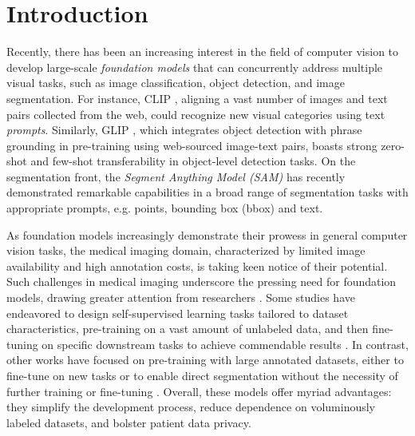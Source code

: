 \documentclass[times,twocolumn,final]{elsarticle}
\begin{document}

\section{Introduction}
\label{sec1}


\par Recently, there has been an increasing interest in the field of computer vision to develop large-scale \textit{foundation models} that can concurrently address multiple visual tasks, such as image classification, object detection, and image segmentation. For instance, CLIP \citep{radford2021learning}, aligning a vast number of images and text pairs collected from the web, could recognize new visual categories using text \textit{prompts}. Similarly, GLIP \citep{li2022grounded, zhang2022glipv2}, which integrates object detection with phrase grounding in pre-training using web-sourced image-text pairs, boasts strong zero-shot and few-shot transferability in object-level detection tasks. On the segmentation front, the \textit{Segment Anything Model (SAM)} \citep{kirillov2023segment} has recently demonstrated remarkable capabilities in a broad range of segmentation tasks with appropriate prompts, e.g. points, bounding box (bbox) and text.

\par As foundation models increasingly demonstrate their prowess in general computer vision tasks, the medical imaging domain, characterized by limited image availability and high annotation costs, is taking keen notice of their potential. Such challenges in medical imaging underscore the pressing need for foundation models, drawing greater attention from researchers \citep{zhang2023challenges}. Some studies have endeavored to design self-supervised learning tasks tailored to dataset characteristics, pre-training on a vast amount of unlabeled data, and then fine-tuning on specific downstream tasks to achieve commendable results \citep{wang2023mis, zhou2023foundation, vorontsov2023virchow}. In contrast, other works have focused on pre-training with large annotated datasets, either to fine-tune on new tasks \citep{huang2023stu} or to enable direct segmentation without the necessity of further training or fine-tuning \citep{butoi2023universeg}. Overall, these models offer myriad advantages: they simplify the development process, reduce dependence on voluminously labeled datasets, and bolster patient data privacy.
\end{document}

